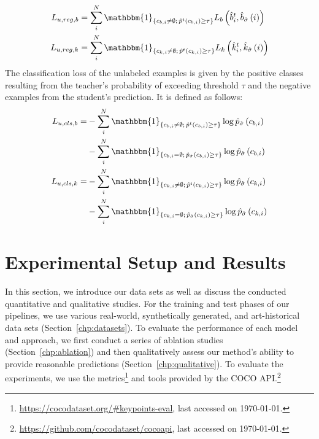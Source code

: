 \documentclass[sigconf]{acmart}
\begin{document}
\begin{align}
    L_{u,reg,b}&=\sum_{i}^N\mathbbm{1}_{\left\{c_{b,i}\neq \emptyset;\, \hat{p}^t\left(c_{b,i}\right)\geq\tau\right\}}L_{b}\left(\hat{b}_i^t,\hat{b}_{\hat{\sigma}}\left(i\right)\right)\\
    L_{u,reg,k}&=\sum_{i}^N\mathbbm{1}_{\left\{c_{k,i}\neq \emptyset;\, \hat{p}^t\left(c_{k,i}\right)\geq\tau\right\}}L_{k}\left(\hat{k}_i^t,\hat{k}_{\hat{\sigma}}\left(i\right)\right)
\end{align}
The classification loss of the unlabeled examples is given by the positive classes resulting from the teacher's probability of exceeding threshold $\tau$ and the negative examples from the student's prediction. It is defined as follows:
\begin{align}
    L_{u,cls,b}=&-\sum_{i}^N
    \mathbbm{1}_{\left\{c_{b,i}\neq \emptyset;\, \hat{p}^t\left(c_{b,i}\right)\geq\tau\right\}}\log\hat{p}_{\hat{\sigma}}\left(c_{b,i}\right)\\
    &-\sum_{i}^N\mathbbm{1}_{\left\{c_{b,i}=\emptyset;\, \hat{p}_{\hat{\sigma}}\left(c_{b,i}\right)\geq\tau\right\}}\log\hat{p}_{\hat{\sigma}}\left(c_{b,i}\right)\nonumber\\
    L_{u,cls,k}=&-\sum_{i}^N
    \mathbbm{1}_{\left\{c_{k,i}\neq \emptyset;\, \hat{p}^t\left(c_{k,i}\right)\geq\tau\right\}}\log\hat{p}_{\hat{\sigma}}\left(c_{k,i}\right)\\
    &-\sum_{i}^N\mathbbm{1}_{\left\{c_{k,i}=\emptyset;\, \hat{p}_{\hat{\sigma}}\left(c_{k,i}\right)\geq\tau\right\}}\log\hat{p}_{\hat{\sigma}}\left(c_{k,i}\right)\nonumber
\end{align}


\section{Experimental Setup and Results}
\label{chp:exp}

In this section, we introduce our data sets as well as discuss the conducted quantitative and qualitative studies. For the training and test phases of our pipelines, we use various real-world, synthetically generated, and art-historical data sets (Section~\ref{chp:datasets}). To evaluate the performance of each model and approach, we first conduct a series of ablation studies (Section~\ref{chp:ablation}) and then qualitatively assess our method's ability to provide reasonable predictions (Section~\ref{chp:qualitative}). To evaluate the experiments, we use the metrics\footnote{\url{https://cocodataset.org/\#keypoints-eval}, last accessed on \today.} and tools provided by the COCO API.\footnote{\url{https://github.com/cocodataset/cocoapi}, last accessed on \today.}
\end{document}
